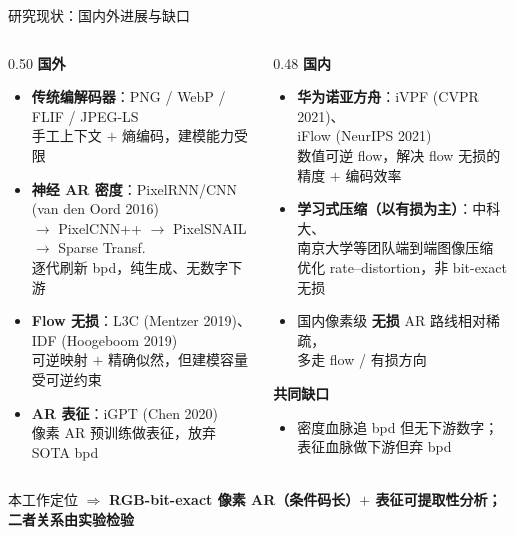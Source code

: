 \documentclass[10pt,aspectratio=169]{beamer}
\begin{document}
\begin{frame}{研究现状：国内外进展与缺口}
\begin{columns}[T]
\begin{column}{0.50\textwidth}
\textbf{国外}
\begin{itemize}\setlength{\itemsep}{2.5pt}\small
  \item \textbf{传统编解码器}：PNG / WebP / FLIF / JPEG-LS \\
        {\scriptsize 手工上下文 $+$ 熵编码，建模能力受限}
  \item \textbf{神经 AR 密度}：PixelRNN/CNN (van den Oord 2016) \\
        $\to$ PixelCNN++ $\to$ PixelSNAIL $\to$ Sparse Transf. \\
        {\scriptsize 逐代刷新 bpd，纯生成、\alert{无数字下游}}
  \item \textbf{Flow 无损}：L3C (Mentzer 2019)、IDF (Hoogeboom 2019) \\
        {\scriptsize 可逆映射 $+$ 精确似然，但建模容量受可逆约束}
  \item \textbf{AR 表征}：iGPT (Chen 2020) \\
        {\scriptsize 像素 AR 预训练做表征，\alert{放弃 SOTA bpd}}
\end{itemize}
\end{column}
\begin{column}{0.48\textwidth}
\textbf{国内}
\begin{itemize}\setlength{\itemsep}{2.5pt}\small
  \item \textbf{华为诺亚方舟}：iVPF (CVPR 2021)、\\
        iFlow (NeurIPS 2021) \\
        {\scriptsize 数值可逆 flow，解决 flow 无损的精度 $+$ 编码效率}
  \item \textbf{学习式压缩（以有损为主）}：中科大、\\
        南京大学等团队端到端图像压缩 \\
        {\scriptsize 优化 rate--distortion，\alert{非 bit-exact 无损}}
  \item {\scriptsize 国内像素级 \textbf{无损} AR 路线相对稀疏，\\
        多走 flow / 有损方向}
\end{itemize}

\medskip
\textbf{共同缺口}
\begin{itemize}\setlength{\itemsep}{2.5pt}\small
  \item 密度血脉追 bpd 但\alert{无下游数字}；表征血脉做下游但\alert{弃 bpd}
\end{itemize}
\end{column}
\end{columns}

\vfill
\centering\small\color{muted}
本工作定位 $\Rightarrow$ \color{ours}\textbf{RGB-bit-exact 像素 AR（条件码长）$+$ 表征可提取性分析；二者关系由实验检验}
\end{frame}
\end{document}

